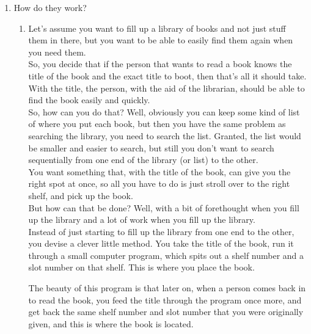 \documentclass [12pt, executivepaper]{article}
\begin{document}
\begin{enumerate}

\item How do they work?

\begin{enumerate}

\item Let's assume you want to fill up a library of books and not just stuff them in there, but you want to be able to easily find them again when you need them.\\

So, you decide that if the person that wants to read a book knows the title of the book and the exact title to boot, then that's all it should take. With the title, the person, with the aid of the librarian, should be able to find the book easily and quickly. \\

So, how can you do that? Well, obviously you can keep some kind of list of where you put each book, but then you have the same problem as searching the library, you need to search the list. Granted, the list would be smaller and easier to search, but still you don't want to search sequentially from one end of the library (or list) to the other.\\

You want something that, with the title of the book, can give you the right spot at once, so all you have to do is just stroll over to the right shelf, and pick up the book.\\

But how can that be done? Well, with a bit of forethought when you fill up the library and a lot of work when you fill up the library.\\

Instead of just starting to fill up the library from one end to the other, you devise a clever little method. You take the title of the book, run it through a small computer program, which spits out a shelf number and a slot number on that shelf. This is where you place the book.\\

\pagebreak 

\vspace*{-40mm}

The beauty of this program is that later on, when a person comes back in to read the book, you feed the title through the program once more, and get back the same shelf number and slot number that you were originally given, and this is where the book is located.\\


\end{enumerate}
\end{enumerate}
\end{document}
